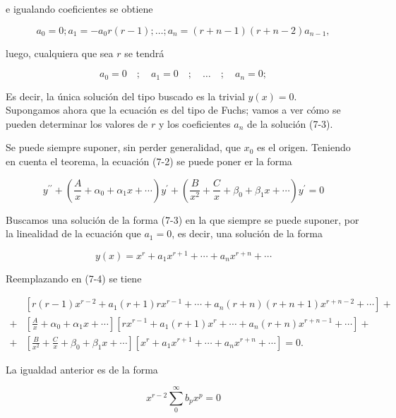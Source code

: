 \documentclass[10pt]{article}
\theoremstyle{plain}
\theoremstyle{definition}
\theoremstyle{remark}
\begin{document}
e igualando coeficientes se obtiene

$$
a_{0}=0 ; a_{1}=-a_{0} r(r-1) ; \ldots ; a_{n}=(r+n-1)(r+n-2) a_{n-1},
$$

luego, cualquiera que sea $r$ se tendrá

$$
a_{0}=0 \quad ; \quad a_{1}=0 \quad ; \quad \ldots \quad ; \quad a_{n}=0 ;
$$

Es decir, la única solución del tipo buscado es la trivial $y(x)=0$.\\
Supongamos ahora que la ecuación es del tipo de Fuchs; vamos a ver cómo se pueden determinar los valores de $r$ y los coeficientes $a_{n}$ de la solución (7-3).

Se puede siempre suponer, sin perder generalidad, que $x_{0}$ es el origen. Teniendo en cuenta el teorema, la ecuación (7-2) se puede poner er la forma


\begin{equation*}
y^{\prime \prime}+\left(\frac{A}{x}+\alpha_{0}+\alpha_{1} x+\cdots\right) y^{\prime}+\left(\frac{B}{x^{2}}+\frac{C}{x}+\beta_{0}+\beta_{1} x+\cdots\right) y^{\prime}=0 \tag{$7\cdot4$}
\end{equation*}


Buscamos una solución de la forma (7-3) en la que siempre se puede suponer, por la linealidad de la ecuación que $a_{1}=0$, es decir, una solución de la forma


\begin{equation*}
y(x)=x^{r}+a_{1} x^{r+1}+\cdots+a_{n} x^{r+n}+\cdots \tag{7-5}
\end{equation*}


Reemplazando en (7-4) se tiene

$$
\begin{aligned}
& {\left[r(r-1) x^{r-2}+a_{1}(r+1) r x^{r-1}+\cdots+a_{n}(r+n)(r+n+1) x^{r+n-2}+\cdots\right]+} \\
+ & {\left[\frac{A}{x}+\alpha_{0}+\alpha_{1} x+\cdots\right]\left[r x^{r-1}+a_{1}(r+1) x^{r}+\cdots+a_{n}(r+n) x^{r+n-1}+\cdots\right]+} \\
+ & {\left[\frac{B}{x^{2}}+\frac{C}{x}+\beta_{0}+\beta_{1} x+\cdots\right]\left[x^{r}+a_{1} x^{r+1}+\cdots+a_{n} x^{r+n}+\cdots\right]=0 . }
\end{aligned}
$$

La igualdad anterior es de la forma


\begin{equation*}
x^{r-2} \sum_{0}^{\infty} b_{p} x^{p}=0 \tag{7-6}
\end{equation*}
\end{document}
